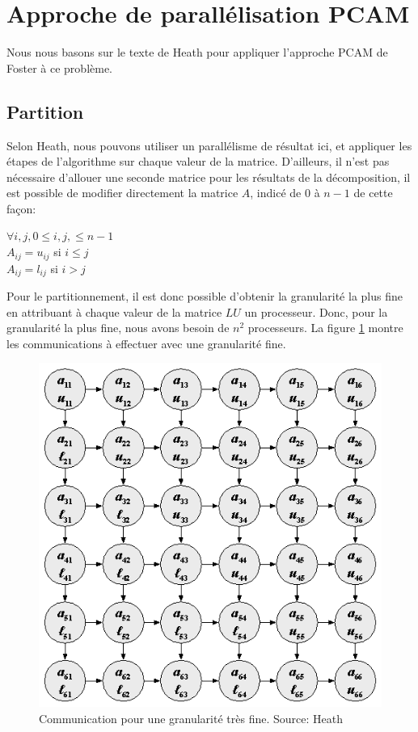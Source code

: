 \documentclass[12pt,letterpaper]{article} %
\begin{document}
\section{Approche de parallélisation PCAM}

Nous nous basons sur le texte de Heath\cite{parallel-lu} pour appliquer l'approche PCAM de
Foster\cite{foster1994comsysthaintHigPerForForM} à ce problème.

\subsection{Partition}

Selon Heath, nous pouvons utiliser un parallélisme de résultat ici, et appliquer les
étapes de l'algorithme sur chaque valeur de la matrice\cite{parallel-lu}. 
D'ailleurs, il n'est pas nécessaire d'allouer une seconde matrice pour les résultats 
de la décomposition, il est possible de modifier directement 
la matrice $A$, indicé de $0$ à $n-1$ de cette façon:

$\forall i, j, 0\le i, j, \le n-1$\\
$A_{ij} = u_{ij}$ si $i \le j$\\
$A_{ij} = l_{ij}$ si $i > j$

Pour le partitionnement, il est donc possible d'obtenir la granularité la plus fine en attribuant
à chaque valeur de la matrice $LU$ un processeur. Donc, pour la granularité la plus fine, nous 
avons besoin de $n^2$ processeurs. La figure \ref{figure1} montre les communications à effectuer
avec une granularité fine.

\begin{figure}[h]
\centering
 \includegraphics{fine_grain.eps}
 \caption{\label{figure1}Communication pour une granularité très fine. Source: Heath\cite{parallel-lu}}
 
\end{figure}
\end{document}
